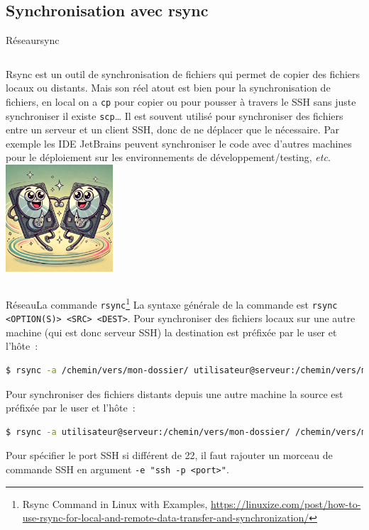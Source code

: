 \documentclass{beamer}
\begin{document}
    \subsection{Synchronisation avec rsync}\label{subsec:rsync-syncro}

    \begin{frame}{Réseau}{rsync}
        \begin{columns}
            Rsync est un outil de synchronisation de fichiers qui permet de copier des fichiers locaux ou distants.
            Mais son réel atout est bien pour la synchronisation de fichiers, en local on a \lstinline{cp} pour copier ou pour pousser à travers le SSH sans juste synchroniser il existe \lstinline{scp}\ldots
            \bigbreak
            Il est souvent utilisé pour synchroniser des fichiers entre un serveur et un client SSH, donc de ne déplacer que le nécessaire.
            \bigbreak
            Par exemple les IDE JetBrains peuvent synchroniser le code avec d'autres machines pour le déploiement sur les environnements de développement/testing, \textit{etc}.
            \centering
            \includegraphics[width=4cm]{image/hdd-synchronous}
        \end{columns}
    \end{frame}

    \begin{frame}[fragile]{Réseau}{La commande \lstinline{rsync}\footnote{Rsync Command in Linux with Examples, \url{https://linuxize.com/post/how-to-use-rsync-for-local-and-remote-data-transfer-and-synchronization/}}}
        La syntaxe générale de la commande est \lstinline{rsync <OPTION(S)> <SRC> <DEST>}.
        Pour synchroniser des fichiers locaux sur une autre machine (qui est donc serveur SSH) la destination est préfixée par le user et l'hôte~:
        \bigbreak
        \begin{lstlisting}[language=bash]
$ rsync -a /chemin/vers/mon-dossier/ utilisateur@serveur:/chemin/vers/mon-dossier/
        \end{lstlisting}
        Pour synchroniser des fichiers distants depuis une autre machine la source est préfixée par le user et l'hôte~:
        \begin{lstlisting}[language=bash]
$ rsync -a utilisateur@serveur:/chemin/vers/mon-dossier/ /chemin/vers/mon-dossier/
        \end{lstlisting}
        Pour spécifier le port SSH si différent de 22, il faut rajouter un morceau de commande SSH en argument \lstinline{-e "ssh -p <port>"}.
    \end{frame}
\end{document}
